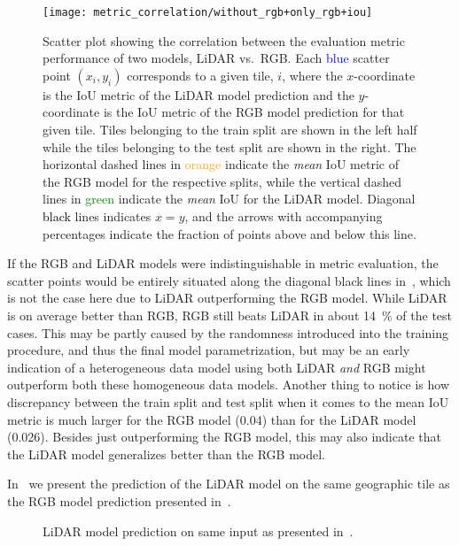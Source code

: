\begin{figure}[H]
  \centering
  \texttt{[image: metric\_correlation/without\_rgb+only\_rgb+iou]}
  \caption{%
    Scatter plot showing the correlation between the evaluation metric performance of two models, LiDAR vs.\ RGB\@.
    Each \textcolor{blue}{blue} scatter point $(x_i, y_i)$ corresponds to a given tile, $i$, where the $x$-coordinate is the IoU metric of the LiDAR model prediction and the $y$-coordinate is the IoU metric of the RGB model prediction for that given tile.
    Tiles belonging to the train split are shown in the left half while the tiles belonging to the test split are shown in the right.
    The horizontal dashed lines in \textcolor{orange}{orange} indicate the \emph{mean} IoU metric of the RGB model for the respective splits, while the vertical dashed lines in \textcolor{green}{green} indicate the \emph{mean} IoU for the LiDAR model.
    Diagonal \textcolor{black}{black} lines indicates $x = y$, and the arrows with accompanying percentages indicate the fraction of points above and below this line.
  }%
  \label{fig:rgb-lidar-correlation}\label{fig:correlation-explanation}
\end{figure}

If the RGB and LiDAR models were indistinguishable in metric evaluation, the scatter points would be entirely situated along the diagonal black lines in~, which is not the case here due to LiDAR outperforming the RGB model.
While LiDAR is on average better than RGB, RGB still beats LiDAR in about \SI{14}{\percent} of the test cases.
This may be partly caused by the randomness introduced into the training procedure, and thus the final model parametrization, but may be an early indication of a heterogeneous data model using both LiDAR \emph{and} RGB might outperform both these homogeneous data models.
Another thing to notice is how discrepancy between the train split and test split when it comes to the mean IoU metric is much larger for the RGB model (\num{0.04}) than for the LiDAR model (\num{0.026}).
Besides just outperforming the RGB model, this may also indicate that the LiDAR model generalizes better than the RGB model.

In~ we present the prediction of the LiDAR model on the same geographic tile as the RGB model prediction presented in~.

\begin{figure}[H]
  \centering
  \caption{%
    LiDAR model prediction on same input as presented in~.
  }%
  \label{fig:lidar-fundamental-issues}
\end{figure}

